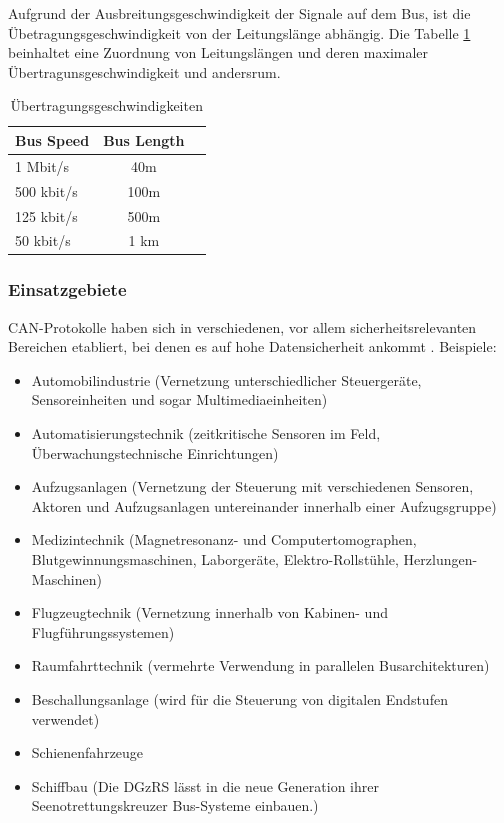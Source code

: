 Aufgrund der Ausbreitungsgeschwindigkeit der Signale auf dem Bus, ist die 
Übetragungsgeschwindigkeit von der Leitungslänge abhängig. Die Tabelle 
\ref{tab:speed} beinhaltet eine Zuordnung von Leitungslängen und deren 
maximaler Übertragunsgeschwindigkeit und andersrum.

\begin{table}[h]
	\centering
	\begin{tabular}{lcr}
		Bus Speed & Bus Length \\
		\hline
		1 Mbit/s & 40m \\
		500 kbit/s & 100m \\
		125 kbit/s & 500m \\
		50 kbit/s & 1 km \\
	\end{tabular}
	\label{tab:speed}
	\caption{Übertragungsgeschwindigkeiten}
\end{table}

\subsubsection{Einsatzgebiete}

CAN-Protokolle haben sich in verschiedenen, vor allem sicherheitsrelevanten 
Bereichen etabliert, bei denen es auf hohe Datensicherheit ankommt 
\citep[nach][]{WI1}. Beispiele:

\begin{itemize}
\item Automobilindustrie (Vernetzung unterschiedlicher Steuergeräte, Sensoreinheiten 
und sogar Multimediaeinheiten)
\item Automatisierungstechnik (zeitkritische Sensoren im Feld, Überwachungstechnische 
Einrichtungen)
\item Aufzugsanlagen (Vernetzung der Steuerung mit verschiedenen Sensoren, Aktoren 
und Aufzugsanlagen untereinander innerhalb einer Aufzugsgruppe)
\item Medizintechnik (Magnetresonanz- und Computertomographen, Blutgewinnungsmaschinen,
 Laborgeräte, Elektro-Rollstühle, Herzlungen-Maschinen)
\item Flugzeugtechnik (Vernetzung innerhalb von Kabinen- und Flugführungssystemen)
\item Raumfahrttechnik (vermehrte Verwendung in parallelen Busarchitekturen)
\item Beschallungsanlage (wird für die Steuerung von digitalen Endstufen verwendet)
\item Schienenfahrzeuge
\item Schiffbau (Die DGzRS lässt in die neue Generation ihrer Seenotrettungskreuzer 
Bus-Systeme einbauen.)
\end{itemize}

